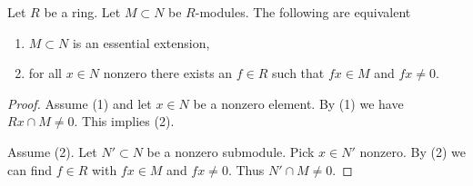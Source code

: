 \begin{lemma}
\label{lemma-essential-extension}
Let $R$ be a ring. Let $M \subset N$ be $R$-modules. The following
are equivalent
\begin{enumerate}
\item $M \subset N$ is an essential extension,
\item for all $x \in N$ nonzero there exists an $f \in R$ such that $fx \in M$
and $fx \not = 0$.
\end{enumerate}
\end{lemma}

\begin{proof}
Assume (1) and let $x \in N$ be a nonzero element. By (1) we have
$Rx \cap M \not = 0$. This implies (2).

\medskip\noindent
Assume (2). Let $N' \subset N$ be a nonzero submodule. Pick $x \in N'$
nonzero. By (2) we can find $f \in R$ with $fx \in M$ and $fx \not = 0$.
Thus $N' \cap M \not = 0$.
\end{proof}
